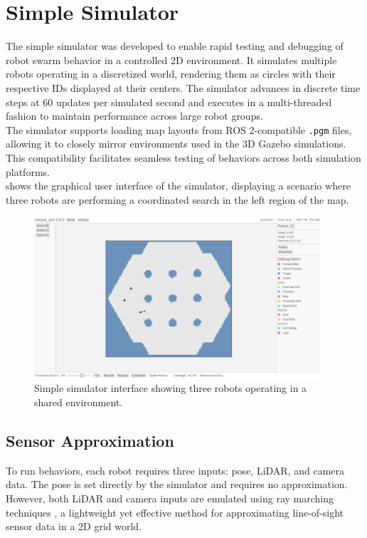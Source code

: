 \section{Simple Simulator}
\label{sec:simple-simulator}
The simple simulator was developed to enable rapid testing and debugging of robot swarm behavior in a controlled 2D environment. It simulates multiple robots operating in a discretized world, rendering them as circles with their respective IDs displayed at their centers. The simulator advances in discrete time steps at 60 updates per simulated second and executes in a multi-threaded fashion to maintain performance across large robot groups.\\

The simulator supports loading map layouts from ROS 2-compatible \texttt{.pgm} files, allowing it to closely mirror environments used in the 3D Gazebo simulations. This compatibility facilitates seamless testing of behaviors across both simulation platforms. \\

 shows the graphical user interface of the simulator, displaying a scenario where three robots are performing a coordinated search in the left region of the map.

\begin{figure}[H]
    \begin{center}
        \includegraphics[width=0.95\textwidth]{figures/screenshots/simple-sim-gui.png}
    \end{center}
    \caption{Simple simulator interface showing three robots operating in a shared environment.}
    \label{fig:simple-sim-interface}
\end{figure}

\subsection{Sensor Approximation}
To run behaviors, each robot requires three inputs: pose, LiDAR, and camera data. The pose is set directly by the simulator and requires no approximation. However, both LiDAR and camera inputs are emulated using ray marching techniques \cite{raymarching}, a lightweight yet effective method for approximating line-of-sight sensor data in a 2D grid world. \\

